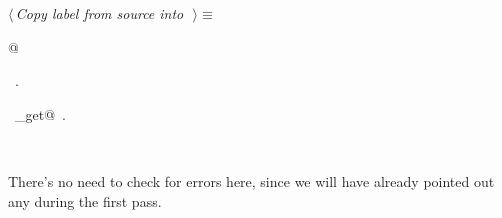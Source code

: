 \documentclass{report}
\begin{document}
\begin{flushleft} \small
\begin{minipage}{\linewidth} \label{scrap76}
$\langle\,${\it Copy label from source into}\nobreak\ {\footnotesize {}}$\,\rangle\equiv$
\vspace{-1ex}
\begin{list}{}{} \item
\mbox{}@{\NWsep}
\end{list}
\vspace{-1ex}
\footnotesize\addtolength{\baselineskip}{-1ex}
\begin{list}{}{\setlength{\itemsep}{-\parsep}\setlength{\itemindent}{-\leftmargin}}
\item \NWtxtMacroRefIn\ .
\end{list}
\vspace{-2ex}
\footnotesize\addtolength{\baselineskip}{-1ex}
\begin{list}{}{\setlength{\itemsep}{-\parsep}\setlength{\itemindent}{-\leftmargin}}
\item \NWtxtIdentsUsed\nobreak\  \verb@source_get@\nobreak\ .\end{list}
\end{minipage}\\[4ex]
\end{flushleft}
There's no need to check for errors here, since we will have already
pointed out any during the first pass.
\end{document}
